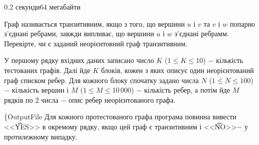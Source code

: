 \begin{problem}{}{}{}{0.2 секунди}{64 мегабайти}

Граф називається транзитивним, якщо з того, що вершини $u$ і $v$ та $v$ і $w$ попарно з'єднані ребрами, завжди випливає, що вершини $u$ і $w$ з'єднані ребрамм.
Перевірте, чи є заданий неорієнтовний граф транзитивним.

\InputFile
У першому рядку вхідних даних записано число $K$ ($1 \le K \le 10$) $-$ кількість тестованих графів. 
Далі йде $K$ блоків, кожен з яких описує один неорієнтований граф списком ребер. 
Для кожного блоку спочатку задано числа $N$ ($1 \le N \le 100$) $-$ кількість вершин і $M$ ($1 \le M \le 10\,000$) $-$ кількість ребер, 
а потім йде $M$ рядків по $2$ числа $-$ опис ребер неорієнтованого графа.

\{OutputFile
Для кожного протестованого графа програма повинна вивести <<{\t{YES}}>> в окремому рядку, якщо цей граф є транзитивним і <<{\t{NO}}>>$-$ у протилежному випадку.

\Example

\begin{example}
%
\end{example}

\end{problem}
